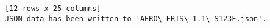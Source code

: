 \documentclass[11pt]{article}
\begin{document}
\begin{Verbatim}[commandchars=\\\{\}]
[12 rows x 25 columns]
JSON data has been written to 'AERO\_ERIS\_1.1\_S123F.json'.
    \end{Verbatim}


    
    
    
\end{document}
